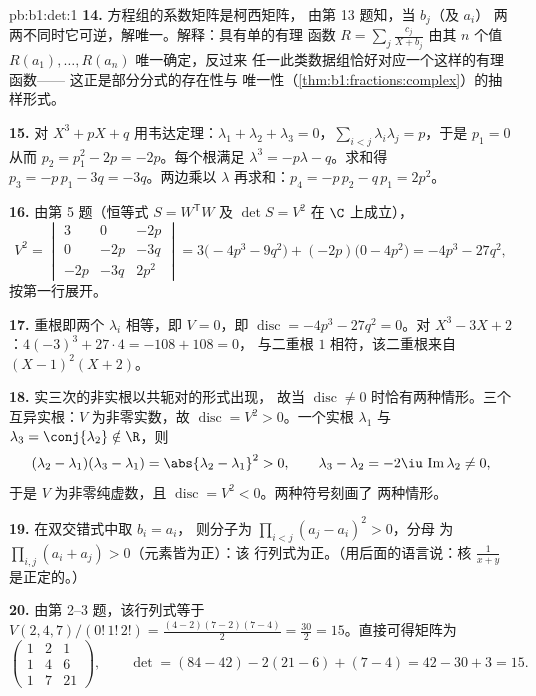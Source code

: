 \begin{solution}{pb:b1:det:1}
\textbf{14.} 方程组的系数矩阵是柯西矩阵，
由第 13 题知，当 $b_j$（及 $a_i$）
两两不同时它可逆，解唯一。解释：具有单的有理
函数 $R = \sum_j \frac{c_j}{X + b_j}$ 由其
$n$ 个值 $R(a_1), \dots, R(a_n)$ 唯一确定，反过来
任一此类数据组恰好对应一个这样的有理函数——
这正是部分分式的存在性与
唯一性（\cref{thm:b1:fractions:complex}）的抽样形式。

\textbf{15.} 对 $X^3 + pX + q$ 用韦达定理：$\lambda_1 + \lambda_2 +
\lambda_3 = 0$，$\sum_{i<j}\lambda_i\lambda_j = p$，于是 $p_1 = 0$
从而 $p_2 = p_1^2 - 2p = -2p$。每个根满足 $\lambda^3 =
-p\lambda - q$。求和得 $p_3 = -p\,p_1 - 3q = -3q$。两边乘以
$\lambda$ 再求和：$p_4 = -p\,p_2 - q\,p_1 = 2p^2$。

\textbf{16.} 由第 5 题（恒等式 $S = W^{\mathsf T}W$
及 $\det S = V^2$ 在 $\C$ 上成立），
\[
V^2 = \begin{vmatrix}
3 & 0 & -2p\\
0 & -2p & -3q\\
-2p & -3q & 2p^2
\end{vmatrix}
= 3\bigl(-4p^3 - 9q^2\bigr) + (-2p)\bigl(0 - 4p^2\bigr)
= -4p^3 - 27q^2 ,
\]
按第一行展开。

\textbf{17.} 重根即两个 $\lambda_i$ 相等，即
$V = 0$，即 $\operatorname{disc} = -4p^3 - 27q^2 = 0$。对
$X^3 - 3X + 2$：$4(-3)^3 + 27\cdot4 = -108 + 108 = 0$，
与二重根 $1$ 相符，该二重根来自 $(X-1)^2(X+2)$。

\textbf{18.} 实三次的非实根以共轭对的形式出现，
故当 $\operatorname{disc} \neq
0$ 时恰有两种情形。三个互异实根：$V$ 为非零实数，故
$\operatorname{disc} = V^2 > 0$。一个实根 $\lambda_1$ 与
$\lambda_3 = \conj{\lambda_2} \notin \R$，则
\[
(\lambda_2 - \lambda_1)(\lambda_3 - \lambda_1) =
\abs{\lambda_2 - \lambda_1}^2 > 0,
\qquad
\lambda_3 - \lambda_2 = -2\iu\,\operatorname{Im}\lambda_2 \neq 0,
\]
于是 $V$ 为非零纯虚数，且
$\operatorname{disc} = V^2 < 0$。两种符号刻画了
两种情形。

\textbf{19.} 在双交错式中取 $b_i = a_i$，
则分子为 $\prod_{i<j}(a_j - a_i)^2 > 0$，分母
为 $\prod_{i,j}(a_i + a_j) > 0$（元素皆为正）：该
行列式为正。（用后面的语言说：核
$\frac1{x+y}$ 是正定的。）

\textbf{20.} 由第 2--3 题，该行列式等于
$V(2,4,7)/(0!\,1!\,2!) = \frac{(4-2)(7-2)(7-4)}{2} =
\frac{30}{2} = 15$。直接可得矩阵为
\[
\begin{pmatrix}
1 & 2 & 1\\
1 & 4 & 6\\
1 & 7 & 21
\end{pmatrix},
\qquad
\det = (84 - 42) - 2(21 - 6) + (7 - 4) = 42 - 30 + 3 = 15 .
\]


\end{solution}

